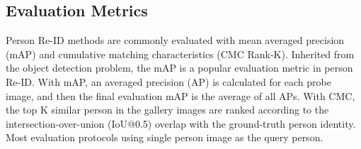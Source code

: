 \documentclass[a4paper,fleqn]{cas-dc}
\begin{document}
\subsection{Evaluation Metrics}
Person Re-ID methods are commonly evaluated with mean averaged precision (mAP) and cumulative matching characteristics (CMC Rank-K). Inherited from the object detection problem, the mAP is a popular evaluation metric in person Re-ID. With mAP, an averaged precision (AP) is calculated for each probe image, and then the final evaluation mAP is the average of all APs. With CMC, the top K similar person in the gallery images are ranked according to the intersection-over-union (IoU@0.5) overlap with the ground-truth person identity. Most evaluation protocols using single person image as the query person.
\begin{table} [t]
\caption{Image-based unsupervised cross-domain person Re-ID evaluation results. Adaptation approach is annotated as described in section \ref{uda}. FA: mid-level feature alignment approach. IT: image style transfer approach. Cluster: clustering-based approach.}
\label{table:uda}
\end{table}
\end{document}
